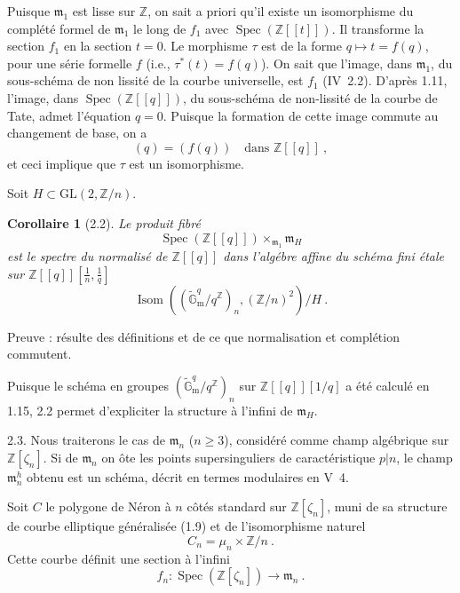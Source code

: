 \documentclass[12pt,a4paper]{amsart}
\theoremstyle{plain}
\newtheorem{corollaire}[proposition]{Corollaire}
\theoremstyle{definition}
\theoremstyle{remark}
\DeclareMathOperator{\Spec}{Spec}
\DeclareMathOperator{\Isom}{Isom}
\newcommand{\ZZ}{\mathbb{Z}}
\newcommand{\Gmtilde}{\widetilde{\mathbb{G}}_\mathrm{m}}
\begin{document}
Puisque $\mathfrak{m}_1$ est lisse sur $\ZZ$, on sait a priori qu'il existe un isomorphisme du compl\'et\'e formel de $\mathfrak{m}_1$ le long de $f_1$ avec $\Spec(\ZZ[[t]])$. Il transforme la section $f_1$ en la section $t = 0$. Le morphisme $\tau$ est de la forme $q \mapsto t = f(q)$, pour une s\'erie formelle $f$ (i.e., $\tau^*(t) = f(q)$). On sait que l'image, dans $\mathfrak{m}_1$, du sous-sch\'ema de non lissit\'e de la courbe universelle, est $f_1$ (IV~2.2). D'apr\`es 1.11, l'image, dans $\Spec(\ZZ[[q]])$, du sous-sch\'ema de non-lissit\'e de la courbe de Tate, admet l'\'equation $q = 0$. Puisque la formation de cette image commute au changement de base, on a
\[
(q) = (f(q)) \quad \text{dans } \ZZ[[q]] \ ,
\]
et ceci implique que $\tau$ est un isomorphisme.

Soit $H \subset \mathrm{GL}(2, \ZZ/n)$.

\begin{corollaire}[2.2]
Le produit fibr\'e
\[
\Spec(\ZZ[[q]]) \times_{\mathfrak{m}_1} \mathfrak{m}_H
\]
est le spectre du normalis\'e de $\ZZ[[q]]$ dans l'alg\'ebre affine du sch\'ema fini \'etale sur $\ZZ[[q]][\frac{1}{n}, \frac{1}{q}]$
\[
\Isom((\Gmtilde^q / q^{\ZZ})_n, (\ZZ/n)^2) / H \ .
\]
\end{corollaire}

\noindent Preuve : r\'esulte des d\'efinitions et de ce que normalisation et compl\'etion commutent.

Puisque le sch\'ema en groupes $(\Gmtilde^q / q^{\ZZ})_n$ sur $\ZZ[[q]][1/q]$ a \'et\'e calcul\'e en 1.15, 2.2 permet d'expliciter la structure \`a l'infini de $\mathfrak{m}_H$.

\medskip

2.3. Nous traiterons le cas de $\mathfrak{m}_n$ ($n \geq 3$), consid\'er\'e comme champ alg\'ebrique sur $\ZZ[\zeta_n]$. Si de $\mathfrak{m}_n$ on \^ote les points supersinguliers de caract\'eristique $p | n$, le champ $\mathfrak{m}_n^h$ obtenu est un sch\'ema, d\'ecrit en termes modulaires en V~4.

Soit $C$ le polygone de N\'eron \`a $n$ c\^ot\'es standard sur $\ZZ[\zeta_n]$, muni de sa structure de courbe elliptique g\'en\'eralis\'ee (1.9) et de l'isomorphisme naturel
\[
C_n = \mu_n \times \ZZ/n \ .
\]
Cette courbe d\'efinit une section \`a l'infini
\begin{equation}\label{eq:2.3.1}
f_n : \Spec(\ZZ[\zeta_n]) \longrightarrow \mathfrak{m}_n \ .
\end{equation}
\end{document}
